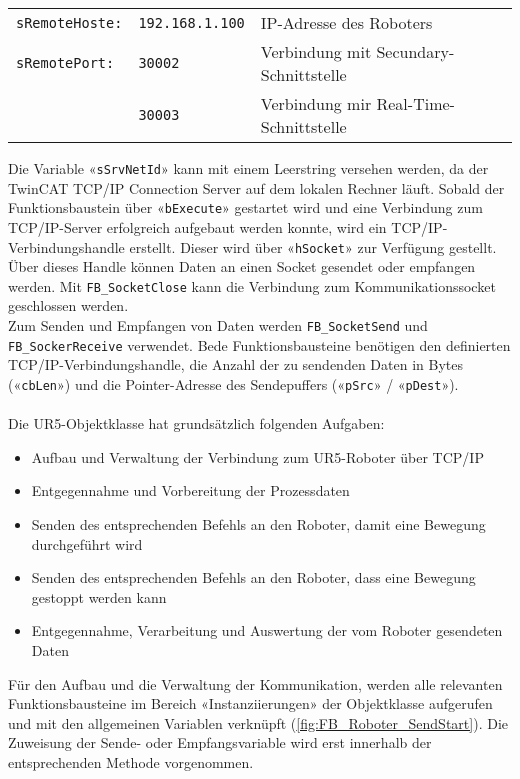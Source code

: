 		\begin{tabularx}{\textwidth}{@{}>{}p{10em} @{}>{}p{8em} X@{}}
			\verb|sRemoteHoste:| 	& \verb|192.168.1.100|	& IP-Adresse des Roboters 
			\\
			\verb|sRemotePort:| 	& \verb|30002| 			& Verbindung mit Secundary-Schnittstelle
			\\
									& \verb|30003|			& Verbindung mir Real-Time-Schnittstelle
			\\
		\end{tabularx}
		
		Die Variable «\verb|sSrvNetId|» kann mit einem Leerstring versehen werden, da der TwinCAT TCP/IP Connection Server auf dem lokalen Rechner läuft. Sobald der Funktionsbaustein über «\verb|bExecute|» gestartet wird und eine Verbindung zum TCP/IP-Server erfolgreich aufgebaut werden konnte, wird ein TCP/IP-Verbindungshandle erstellt. Dieser wird über «\verb|hSocket|» zur Verfügung gestellt. Über dieses Handle können Daten an einen Socket gesendet oder empfangen werden. Mit \verb|FB_SocketClose| kann die Verbindung zum Kommunikationssocket geschlossen werden.
		\\
		Zum Senden und Empfangen von Daten werden \verb|FB_SocketSend| und \verb|FB_SockerReceive| verwendet. Bede Funktionsbausteine benötigen den definierten TCP/IP-Verbindungshandle, die Anzahl der zu sendenden Daten in Bytes («\verb|cbLen|») und die Pointer-Adresse des Sendepuffers («\verb|pSrc|» / «\verb|pDest|»). 
		\\
		\\
		Die UR5-Objektklasse hat grundsätzlich folgenden Aufgaben: 
		\begin{itemize}
			\item Aufbau und Verwaltung der Verbindung zum UR5-Roboter über TCP/IP
			\item Entgegennahme und Vorbereitung der Prozessdaten
			\item Senden des entsprechenden Befehls an den Roboter, damit eine Bewegung durchgeführt wird
			\item Senden des entsprechenden Befehls an den Roboter, dass eine Bewegung gestoppt werden kann
			\item Entgegennahme, Verarbeitung und Auswertung der vom Roboter gesendeten Daten
		\end{itemize}
		
		\newpage
		
		Für den Aufbau und die Verwaltung der Kommunikation, werden alle relevanten Funktionsbausteine im Bereich «Instanziierungen» der Objektklasse aufgerufen und mit den allgemeinen Variablen verknüpft (\ref{fig:FB_Roboter_SendStart}). Die Zuweisung der Sende- oder Empfangsvariable wird erst innerhalb der entsprechenden Methode vorgenommen. 
		
